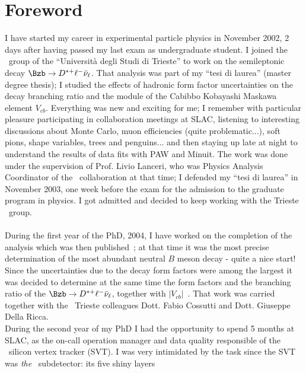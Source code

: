\chapter*{Foreword}

I have started my career in experimental particle physics in November 2002, 2 days after having passed 
my last exam as  undergraduate student. I joined the \babar\ group of the ``Universit\`a degli Studi 
di Trieste'' to work on the semileptonic decay $\Bzb\to D^{*+}\ell^{-}\bar{\nu}_{\ell}$. That analysis 
was part of my ``tesi di laurea'' (master degree thesis); I studied the effects of hadronic form factor 
uncertainties on the decay branching ratio
 and the module of the Cabibbo Kobayashi Maskawa element $V_{cb}$. 
 Everything was new and exciting for me; I remember 
with particular pleasure participating in collaboration meetings at SLAC, listening to interesting 
discussions about Monte Carlo, muon efficiencies (quite problematic...), soft pions, shape variables, 
trees and penguins... and then staying up late at night to understand the results of data fits with PAW 
and Minuit.
\newline The work was done under the supervision of Prof. Livio Lanceri, who was Physics Analysis Coordinator 
of the \babar\ collaboration at that time;   I defended my ``tesi di laurea'' in November 2003, 
one week before the exam for the admission to the graduate program in physics. I got admitted 
and decided to keep working with the Trieste \babar\ group.
\\ \\
During the first year of the PhD, 2004, I have worked on the completion of the analysis which was 
then published~\cite{PhysRevD.71.051502}; at that time it was the most precise determination of the most 
abundant neutral $B$ meson decay - quite a nice start! 
Since the uncertainties due to the decay form factors were among the largest  it was decided 
to determine at the same time the form factors and  the branching ratio of the 
$\Bzb\to D^{*+}\ell^{-}\bar{\nu}_{\ell}$, together with $|V_{cb}|$~\cite{PhysRevD.77.032002}. 
That work was carried together with the \babar\ Trieste colleagues Dott. Fabio Cossutti and Dott. 
Giuseppe Della Ricca.
\\During the second year of my PhD I had the opportunity to spend 5 months at SLAC, as 
the on-call operation manager and data quality responsible of the \babar\ silicon vertex tracker (SVT). 
I was very intimidated by the task since the SVT was {\it the} \babar\ subdetector: its five shiny layers 
